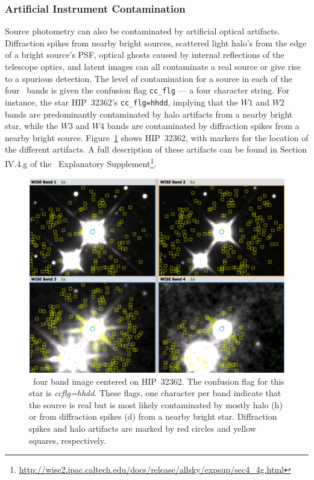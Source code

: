     
        \subsubsection{Artificial Instrument Contamination}
    Source photometry can also be contaminated by artificial optical artifacts.  Diffraction spikes from nearby bright sources, scattered light halo's from the edge of a bright source's PSF, optical ghosts caused by internal reflections of the telescope optics, and latent images can all contaminate a real source or give rise to a spurious detection. The level of contamination for a source in each of the four \WS\ bands is given  the confusion flag \verb|cc_flg| --- a four character string. For instance, the star HIP~32362's \verb|cc_flg=hhdd|, implying that the $W1$ and $W2$ bands are predominantly contaminated by halo artifacts from a nearby bright star, while the $W3$ and $W4$ bands are contaminated by diffraction spikes from a nearby bright source. Figure~\ref{fig:ccflag_contamination} shows HIP~32362, with markers for the location of the different artifacts. A full description of these artifacts can be found in Section IV.4.g of the \WS\ Explanatory Supplement\footnote{\url{http://wise2.ipac.caltech.edu/docs/release/allsky/expsup/sec4_4g.html}}. 
        
        
        \begin{figure}
        \centering
        \includegraphics[width=\textwidth]{Ch2/ccflag_hhdd_HIP32362}
        \caption[Contamination From Optical Articats]{\WS\ four band image centered on HIP~32362. The confusion flag for this star is \textit{ccflg=hhdd}. These flags, one character per band indicate that the source is real but is most likely contaminated by mostly halo (h) or from diffraction spikes (d) from a nearby bright star. Diffraction spikes and halo artifacts are marked by red circles and yellow squares, respectively.}
        \label{fig:ccflag_contamination}
        \end{figure}
        
